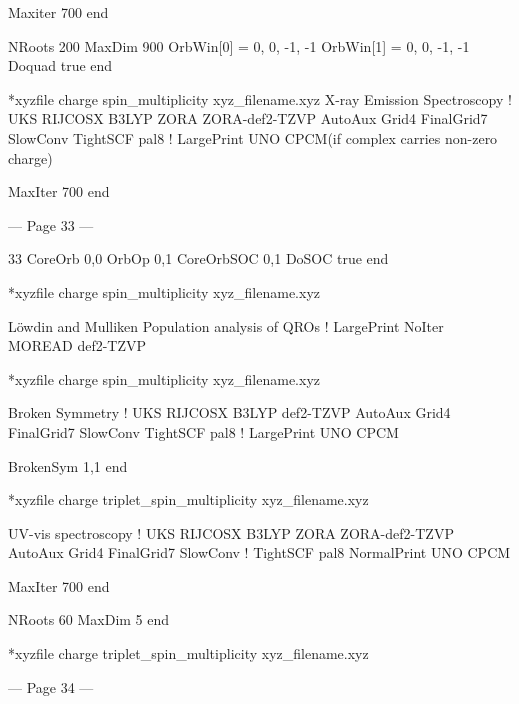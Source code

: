 Maxiter 700 
end 
 
  
NRoots 200   
MaxDim 900     
OrbWin[0] = 0, 0, -1, -1   
OrbWin[1] = 0, 0, -1, -1  
Doquad true   
end  
  
*xyzfile charge spin_multiplicity xyz_filename.xyz 
X-ray Emission Spectroscopy 
! UKS RIJCOSX B3LYP ZORA ZORA-def2-TZVP AutoAux Grid4 FinalGrid7 SlowConv TightSCF pal8  
! LargePrint UNO CPCM(if complex carries non-zero charge) 
 
MaxIter 700 
end 
 
 


--- Page 33 ---
 
33 
CoreOrb 0,0 
OrbOp 0,1 
CoreOrbSOC 0,1 
DoSOC true 
end 
 
*xyzfile charge spin_multiplicity xyz_filename.xyz 
 
Löwdin and Mulliken Population analysis of QROs 
! LargePrint NoIter MOREAD def2-TZVP 
 
 
*xyzfile charge spin_multiplicity xyz_filename.xyz 
 
Broken Symmetry 
! UKS RIJCOSX B3LYP def2-TZVP AutoAux Grid4 FinalGrid7 SlowConv TightSCF pal8  
! LargePrint UNO CPCM 
 
BrokenSym 1,1 
end 
 
 
*xyzfile charge triplet_spin_multiplicity xyz_filename.xyz 
 
UV-vis spectroscopy 
! UKS RIJCOSX B3LYP ZORA ZORA-def2-TZVP AutoAux Grid4 FinalGrid7 SlowConv  
! TightSCF pal8 NormalPrint UNO CPCM 
 
MaxIter 700 
end 
 
 
NRoots 60 
MaxDim 5 
end 
 
*xyzfile charge triplet_spin_multiplicity xyz_filename.xyz 
 
 


--- Page 34 ---
 

